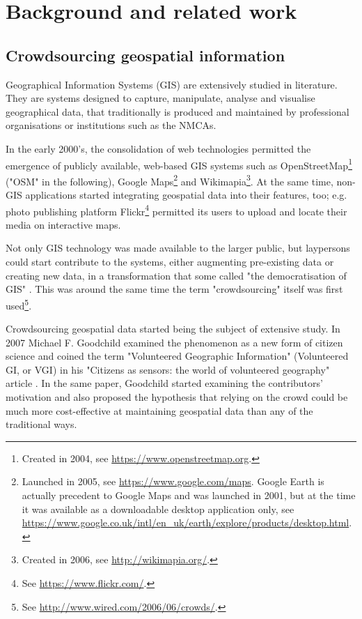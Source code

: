 \section{Background and related work}

\subsection{Crowdsourcing geospatial information}

Geographical Information Systems (GIS) are extensively studied in literature. They are systems designed to capture, manipulate, analyse and visualise geographical data, that traditionally is produced and maintained by professional organisations or institutions such as the NMCAs. 

In the early 2000's, the consolidation of web technologies permitted the emergence of publicly available, web-based GIS systems such as OpenStreetMap\footnote{Created in 2004, see \url{https://www.openstreetmap.org}.} ("OSM" in the following), Google Maps\footnote{Launched in 2005, see \url{https://www.google.com/maps}. Google Earth is actually precedent to Google Maps and was launched in 2001, but at the time it was available as a downloadable desktop application only, see \url{https://www.google.co.uk/intl/en_uk/earth/explore/products/desktop.html}.} and Wikimapia\footnote{Created in 2006, see \url{http://wikimapia.org/}.}. At the same time, non-GIS applications started integrating geospatial data into their features, too; e.g. photo publishing platform Flickr\footnote{See \url{https://www.flickr.com/}.} permitted its users to upload and locate their media on interactive maps. 

Not only GIS technology was made available to the larger public, but laypersons could start contribute to the systems, either augmenting pre-existing data or creating new data, in a transformation that some called "the democratisation of GIS" \cite{Butler:2006fe}. This was around the same time the term "crowdsourcing" itself was first used\footnote{See \url{http://www.wired.com/2006/06/crowds/}.}.

Crowdsourcing geospatial data started being the subject of extensive study. In 2007 Michael F. Goodchild examined the phenomenon as a new form of citizen science and coined the term "Volunteered Geographic Information" (Volunteered GI, or VGI) in his "Citizens as sensors: the world of volunteered geography" article \cite{Goodchild:2007vt}. In the same paper, Goodchild started examining the contributors' motivation and also proposed the hypothesis that relying on the crowd could be much more cost-effective at maintaining geospatial data than any of the traditional ways.


